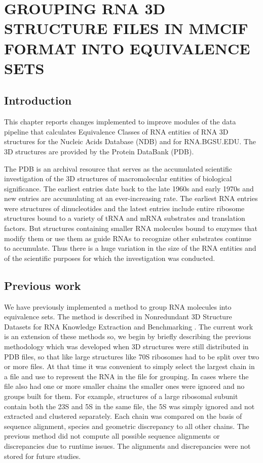 \chapter{GROUPING RNA 3D STRUCTURE FILES IN MMCIF FORMAT INTO EQUIVALENCE SETS}

\section{Introduction}

This chapter reports changes implemented to improve modules of the data pipeline
that calculates Equivalence Classes of RNA entities of RNA 3D structures for the
Nucleic Acids Database (NDB) and for RNA.BGSU.EDU. The 3D structures are
provided by the Protein DataBank (PDB).

The PDB is an archival resource that serves as  the accumulated scientific
investigation of the 3D structures of macromolecular entities of biological
significance. The earliest entries date back to the late 1960s and early 1970s
and new entries are accumulating at an ever-increasing rate. The earliest RNA
entries were structures of dinucleotides and the latest entries include entire
ribosome structures bound to a variety of tRNA and mRNA substrates and
translation factors. But structures containing smaller RNA molecules bound to
enzymes that modify them or use them as guide RNAs  to recognize other
substrates continue to accumulate. Thus there is a huge variation in the size of
the RNA entities and of the scientific purposes for which the investigation was
conducted.

\section{Previous work}

We have previously implemented a method to group RNA molecules into equivalence
sets. The method is described in Nonredundant 3D Structure Datasets for RNA
Knowledge Extraction and Benchmarking \cite{Leontis2012b}. The current work is
an extension of these methods so, we begin by briefly describing the previous
methodology which was developed when 3D structures were still distributed in PDB
files, so that like large structures like 70S ribosomes had to be split over two
or more files. At that time it was convenient to simply select the largest chain
in a file and use to represent the RNA in the file for grouping. In cases where
the file also had one or more smaller chains the smaller ones were ignored and
no groups built for them. For example, structures of a large ribosomal subunit
contain both the 23S and 5S in the same file, the 5S was simply ignored and not
extracted and clustered separately. Each chain was compared on the basis of
sequence alignment, species and geometric discrepancy to all other chains. The
previous method did not compute all possible sequence alignments or
discrepancies due to runtime issues. The alignments and discrepancies were not
stored for future studies.


